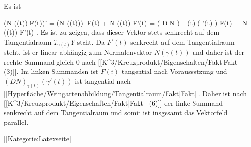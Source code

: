 Es ist

\mavergleichskettealign
{\vergleichskettealign
{ (N (\gamma(t)) \times F(t))'
}
{ =} { (N (\gamma(t)))' \times F(t) +  N (\gamma(t)) \times F'(t)
}
{ =} { \left(  D N   \right)_{ \gamma(t)} \left(   \gamma'(t)   \right)  \times F(t) +  N (\gamma(t)) \times F'(t)
}
{ } {
}
{ } {
}
}
{}
{}{.}
Es ist zu zeigen, dass dieser Vektor stets senkrecht auf dem Tangentialraum $T_{\gamma(t)}Y$ steht. Da $F'(t)$ senkrecht auf dem
Tangentialraum steht, ist er linear abhängig zum Normalenvektor $N (\gamma(t))$ und daher ist der rechte Summand gleich $0$ nach
[[K^3/Kreuzprodukt/Eigenschaften/Fakt|Fakt   (3)]].
Im linken Summanden ist $F(t)$ tangential nach Voraussetzung und $\left(  D N   \right)_{ \gamma(t)} \left(   \gamma'(t)   \right)$ ist tangential nach
[[Hyperfläche/Weingartenabbildung/Tangentialraum/Fakt|Fakt]].
Daher ist nach
[[K^3/Kreuzprodukt/Eigenschaften/Fakt|Fakt   (6)]]
der linke Summand senkrecht auf dem Tangentialraum und somit ist insgesamt das Vektorfeld parallel.

 [[Kategorie:Latexseite]]
